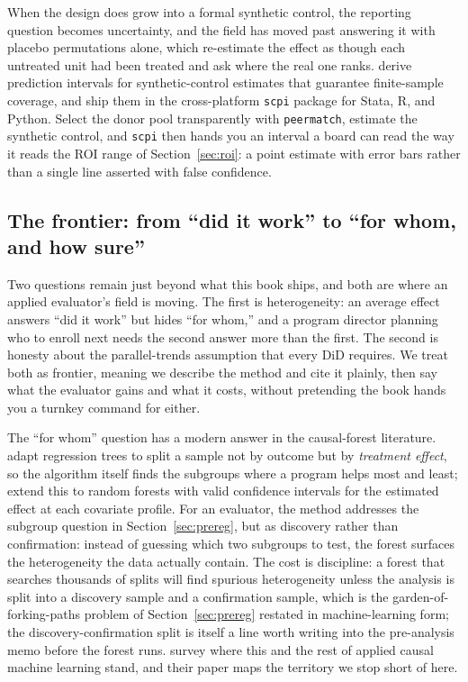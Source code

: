 When the design does grow into a formal synthetic control, the reporting question becomes uncertainty, and the field has moved past answering it with placebo permutations alone, which re-estimate the effect as though each untreated unit had been treated and ask where the real one ranks. \textcite{cattaneo2021prediction} derive prediction intervals for synthetic-control estimates that guarantee finite-sample coverage, and \textcite{cattaneo2025scpi} ship them in the cross-platform \texttt{scpi} package for Stata, R, and Python. Select the donor pool transparently with \texttt{peermatch}, estimate the synthetic control, and \texttt{scpi} then hands you an interval a board can read the way it reads the ROI range of Section~\ref{sec:roi}: a point estimate with error bars rather than a single line asserted with false confidence.

\subsection{The frontier: from ``did it work'' to ``for whom, and how sure''}\label{ch08-sec:frontier}
Two questions remain just beyond what this book ships, and both are where an applied evaluator's field is moving. The first is heterogeneity: an average effect answers \enquote{did it work} but hides \enquote{for whom,} and a program director planning who to enroll next needs the second answer more than the first. The second is honesty about the parallel-trends assumption that every DiD requires. We treat both as frontier, meaning we describe the method and cite it plainly, then say what the evaluator gains and what it costs, without pretending the book hands you a turnkey command for either.

The \enquote{for whom} question has a modern answer in the causal-forest literature. \textcite{athey2016recursive} adapt regression trees to split a sample not by outcome but by \emph{treatment effect}, so the algorithm itself finds the subgroups where a program helps most and least; \textcite{wager2018forests} extend this to random forests with valid confidence intervals for the estimated effect at each covariate profile. For an evaluator, the method addresses the subgroup question in Section~\ref{sec:prereg}, but as discovery rather than confirmation: instead of guessing which two subgroups to test, the forest surfaces the heterogeneity the data actually contain. The cost is discipline: a forest that searches thousands of splits will find spurious heterogeneity unless the analysis is split into a discovery sample and a confirmation sample, which is the garden-of-forking-paths problem of Section~\ref{sec:prereg} restated in machine-learning form; the discovery-confirmation split is itself a line worth writing into the pre-analysis memo before the forest runs. \textcite{athey2017state} survey where this and the rest of applied causal machine learning stand, and their paper maps the territory we stop short of here.

